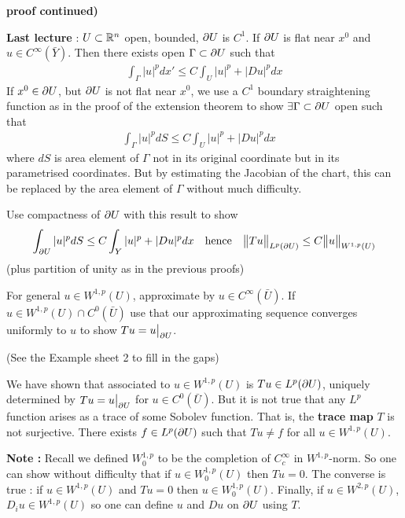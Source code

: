 \documentclass[12pt,a4paper]{report}
\newenvironment{proof}
{\begin{changemargin}{1cm}{0.5cm} 
	}%
	{\end{changemargin}
}
\begin{document}
\begin{proof}
\textbf{proof continued) } 

\textbf{Last lecture} : $U \subset \mathbb{R}^n$ open, bounded, $\partial U$ is $C^1$. If $\partial U$ is flat near $x^0$ and $u\in C^{\infty} (\bar{Y})$. Then there exists open $\Gamma \subset \partial U$ such that
\begin{align*}
\int_{\Gamma} |u|^p dx' \leq C \int_U |u|^p + |Du|^p dx
\end{align*}
If $x^0 \in \partial U$, but $\partial U$ is not flat near $x^0$, we use a $C^1$ boundary straightening function as in the proof of the extension theorem to show $\exists \Gamma \subset \partial U$ open such that
\begin{align*}
\int_{\Gamma} |u|^p dS \leq C \int_{U} |u|^p + |Du|^p dx \quad 
\end{align*}
where $dS$ is area element of $\Gamma$ not in its original coordinate but in its parametrised coordinates. But by estimating the Jacobian of the chart, this can be replaced by the area element of $\Gamma$ without much difficulty.

\quad Use compactness of $\partial U$ with this result to show
\begin{align*}
\int_{\partial U} |u|^p dS \leq C\int_{Y} |u|^p + |Du|^p dx \quad \text{hence} \quad \bigl\lVert Tu\bigr\rVert_{L^p(\partial U)} \leq C\bigl\lVert u\bigr\rVert_{W^{1,p}(U)}
\end{align*}
(plus partition of unity as in the previous proofs)

\quad For general $u\in W^{1,p}(U)$, approximate by $u\in C^{\infty}(\bar{U})$. If $u\in W^{1,p}(U) \cap C^0(\bar{U})$ use that our approximating sequence converges uniformly to $u$ to show $Tu = u\big|_{\partial U}$.

(See the Example sheet 2 to fill in the gaps)
\end{proof}
\s

We have shown that associated to $u \in W^{1,p}(U)$ is $Tu \in L^p(\partial U)$, uniquely determined by $Tu=u\big|_{\partial U}$ for $u \in C^0(\bar{U})$. But it is not true that any $L^p$ function arises as a trace of some Sobolev function. That is, the \textbf{trace map} $T$ is not surjective. There exists $f \in L^p(\partial U)$ such that $Tu \neq f$ for all $u \in W^{1,p}(U)$.
\s

\textbf{Note :} Recall we defined $W_0^{1,p}$ to be the completion of $C_c^{\infty}$ in $W^{1,p}$-norm. So one can show without difficulty that if $u \in W_0^{1,p}(U)$ then $Tu=0$. The converse is true : if $u\in W^{1,p}(U)$ and $Tu =0$ then $u \in W_0^{1,p}(U)$. Finally, if $u\in W^{2,p}(U)$, $D_i u \in W^{1,p}(U)$ so one can define $u$ and $Du$ on $\partial U$ using $T$.
\s
\end{document}
